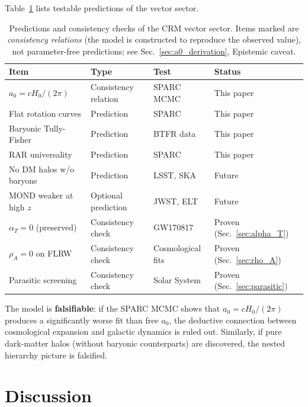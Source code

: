 \documentclass[aps,prd,twocolumn,superscriptaddress,nofootinbib]{revtex4-2}
\begin{document}
Table~\ref{tab:predictions} lists testable predictions of the vector sector.

\begin{table}[tbp]
\caption{\label{tab:predictions}Predictions and consistency checks of the CRM vector sector.
Items marked \dag{} are \emph{consistency relations} (the model is constructed to reproduce the observed value), not parameter-free predictions; see Sec.~\ref{sec:a0_derivation}, Epistemic caveat.}
\begin{ruledtabular}
\begin{tabular}{llll}
Item & Type & Test & Status \\
\hline
$a_0 = cH_0/(2\pi)$\dag{} & Consistency relation & SPARC MCMC & This paper \\
Flat rotation curves & Prediction & SPARC & This paper \\
Baryonic Tully-Fisher & Prediction & BTFR data & This paper \\
RAR universality & Prediction & SPARC & This paper \\
No DM halos w/o baryons & Prediction & LSST, SKA & Future \\
MOND weaker at high $z$ & Optional prediction & JWST, ELT & Future \\
$\alpha_T = 0$ (preserved) & Consistency check & GW170817 & Proven (Sec.~\ref{sec:alpha_T}) \\
$\rho_A = 0$ on FLRW & Consistency check & Cosmological fits & Proven (Sec.~\ref{sec:rho_A}) \\
Parasitic screening & Consistency check & Solar System & Proven (Sec.~\ref{sec:parasitic}) \\
\end{tabular}
\end{ruledtabular}
\end{table}

The model is \textbf{falsifiable}: if the SPARC MCMC shows that $a_0 = cH_0/(2\pi)$ produces a significantly worse fit than free $a_0$, the deductive connection between cosmological expansion and galactic dynamics is ruled out. Similarly, if pure dark-matter halos (without baryonic counterparts) are discovered, the nested hierarchy picture is falsified.


\section{Discussion}
\label{sec:discussion}
\end{document}
